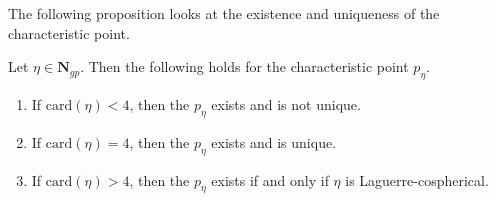 The following proposition looks at the existence and uniqueness of the characteristic point.

\begin{proposition}\label{prop:charpoint}
	Let $\eta\in \mathbf N_{gp}$. Then the following holds for the characteristic point $p_\eta$.
	\begin{enumerate}
		\item If $\mathrm{card}(\eta)<4$, then the $p_\eta$ exists and is not unique.
		\item If $\mathrm{card}(\eta)=4$, then the $p_\eta$ exists and is unique.
		\item If $\mathrm{card}(\eta)>4$, then the $p_\eta$ exists if and only if $\eta$ is Laguerre-cospherical.
	\end{enumerate}
\end{proposition}
